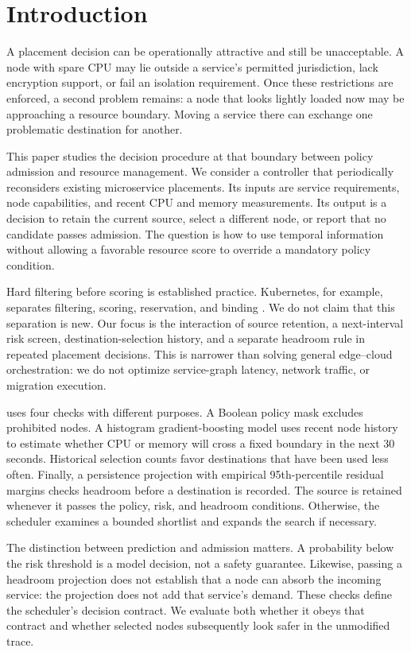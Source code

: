 \section{Introduction}\label{sec:introduction}
A placement decision can be operationally attractive and still be
unacceptable. A node with spare CPU may lie outside a service's permitted
jurisdiction, lack encryption support, or fail an isolation requirement.
Once these restrictions are enforced, a second problem remains: a node
that looks lightly loaded now may be approaching a resource boundary.
Moving a service there can exchange one problematic destination for
another.

This paper studies the decision procedure at that boundary between policy
admission and resource management. We consider a controller that periodically
reconsiders existing microservice placements. Its inputs are service
requirements, node capabilities, and recent CPU and memory measurements.
Its output is a decision to retain the current source, select a different
node, or report that no candidate passes admission. The question is how to
use temporal information without allowing a favorable resource score to
override a mandatory policy condition.

Hard filtering before scoring is established practice. Kubernetes, for
example, separates filtering, scoring, reservation, and binding
\citep{kubernetes2026}. We do not claim that this separation is new.
Our focus is the interaction of source retention, a next-interval risk
screen, destination-selection history, and a separate headroom rule in
repeated placement decisions. This is narrower than solving general
edge--cloud orchestration: we do not optimize service-graph latency,
network traffic, or migration execution.

\cage uses four checks with different purposes. A Boolean policy mask
excludes prohibited nodes. A histogram gradient-boosting model uses recent
node history to estimate whether CPU or memory will cross a fixed boundary
in the next 30 seconds. Historical selection counts favor destinations
that have been used less often. Finally, a persistence projection with
empirical 95th-percentile residual margins checks headroom before a
destination is recorded. The source is retained whenever it passes the
policy, risk, and headroom conditions. Otherwise, the scheduler examines
a bounded shortlist and expands the search if necessary.

The distinction between prediction and admission matters. A probability
below the risk threshold is a model decision, not a safety guarantee.
Likewise, passing a headroom projection does not establish that a node can
absorb the incoming service: the projection does not add that service's
demand. These checks define the scheduler's decision contract. We evaluate
both whether it obeys that contract and whether selected nodes subsequently
look safer in the unmodified trace.


